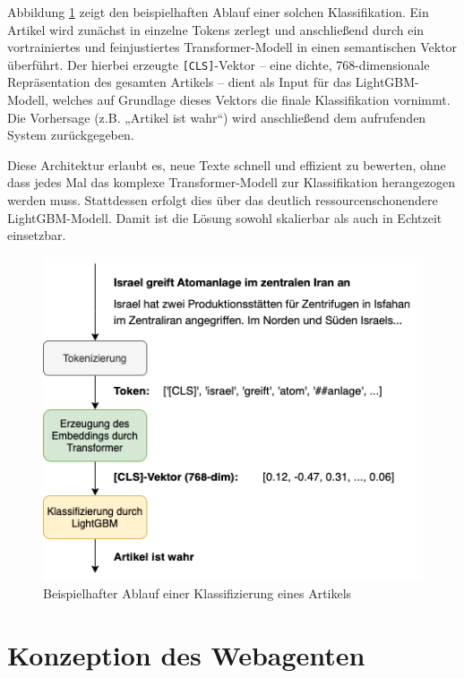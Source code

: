 Abbildung \ref{fig:beispielablauf_gesamt} zeigt den beispielhaften Ablauf einer solchen Klassifikation. 
Ein Artikel wird zunächst in einzelne Tokens zerlegt und anschließend durch ein vortrainiertes und feinjustiertes Transformer-Modell in einen semantischen Vektor überführt. 
Der hierbei erzeugte \texttt{[CLS]}-Vektor – eine dichte, 768-dimensionale Repräsentation des gesamten Artikels – dient als Input für das LightGBM-Modell, 
welches auf Grundlage dieses Vektors die finale Klassifikation vornimmt. Die Vorhersage (z.B. „Artikel ist wahr“) wird anschließend dem aufrufenden System zurückgegeben.

Diese Architektur erlaubt es, neue Texte schnell und effizient zu bewerten, ohne dass jedes Mal das komplexe Transformer-Modell zur Klassifikation herangezogen werden muss. 
Stattdessen erfolgt dies über das deutlich ressourcenschonendere LightGBM-Modell. Damit ist die Lösung sowohl skalierbar als auch in Echtzeit einsetzbar.

\begin{figure}[htbp]
    \begin{center}
        \includegraphics[scale=0.6]{diagrams/beispielablauf_gesamt.png}
        \caption{\label{fig:beispielablauf_gesamt} Beispielhafter Ablauf einer Klassifizierung eines Artikels}
    \end{center}
\end{figure}

\section{Konzeption des Webagenten} \label{sec:06:hauptkomponente}

